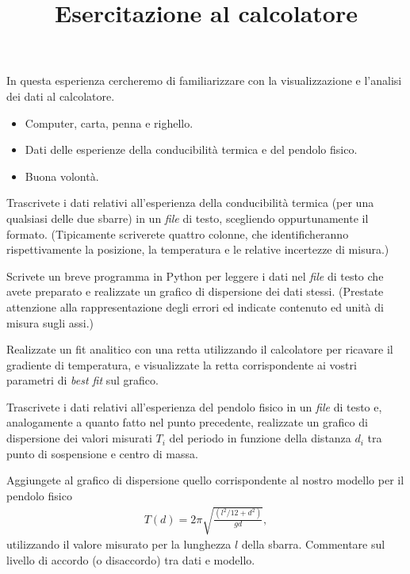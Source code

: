 \documentclass{lab1-article}
\title{Esercitazione al calcolatore}
\begin{document}
\begin{article}

\maketitle

\secsummary

In questa esperienza cercheremo di familiarizzare con la visualizzazione e
l'analisi dei dati al calcolatore.


\secmaterials

\begin{itemize}
\item Computer, carta, penna e righello.
\item Dati delle esperienze della conducibilit\`a termica e del pendolo
  fisico.
\item Buona volont\`a.
\end{itemize}





Trascrivete i dati relativi all'esperienza della conducibilit\`a termica
(per una qualsiasi delle due sbarre) in un \emph{file} di testo, scegliendo
oppurtunamente il formato. (Tipicamente scriverete quattro colonne,
che identificheranno rispettivamente la posizione, la temperatura e le
relative incertezze di misura.)

Scrivete un breve programma in Python per leggere i dati nel \emph{file}
di testo che avete preparato e realizzate un grafico di dispersione dei dati
stessi. (Prestate attenzione alla rappresentazione degli errori ed indicate
contenuto ed unit\`a di misura sugli assi.)

Realizzate un fit analitico con una retta utilizzando il calcolatore per
ricavare il gradiente di temperatura, e visualizzate la retta corrispondente
ai vostri parametri di \emph{best fit} sul grafico.



Trascrivete i dati relativi all'esperienza del pendolo fisico in un \emph{file}
di testo e, analogamente a quanto fatto nel punto precedente, realizzate
un grafico di dispersione dei valori misurati $T_i$ del periodo in funzione
della distanza $d_i$ tra punto di sospensione e centro di massa.

Aggiungete al grafico di dispersione quello corrispondente al nostro modello
per il pendolo fisico
\begin{align}\label{eq:period}
  T(d) = 2\pi\sqrt{\frac{(l^2/12 + d^2)}{gd}},
\end{align}
utilizzando il valore misurato per la lunghezza $l$ della sbarra. Commentare sul
livello di accordo (o disaccordo) tra dati e modello.


\end{article}
\end{document}
